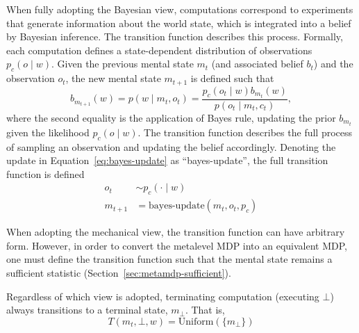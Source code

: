 When fully adopting the Bayesian view, computations correspond to experiments that generate information about the world state, which is integrated into a belief by Bayesian inference. The transition function describes this process. Formally, each computation defines a state-dependent distribution of observations $p_c(o \mid w)$. Given the previous mental state $m_t$ (and associated belief $b_t$) and the observation $o_t$, the new mental state $m_{t+1}$ is defined such that
%
\begin{equation}\label{eq:bayes-update}
  b_{m_{t+1}}(w) = p(w \mid m_t, o_t) = \frac{
    p_c(o_t \mid w) b_{m_t}(w) 
  }{
    p(o_t \mid m_t, c_t)
  },
\end{equation}
%
where the second equality is the application of Bayes rule, updating the prior $b_{m_t}$ given the likelihood $p_c(o \mid w)$. The transition function describes the full process of sampling an observation and updating the belief accordingly. Denoting the update in Equation~\ref{eq:bayes-update} as ``bayes-update'', the full transition function is defined
%
\begin{align}
  o_t &\sim p_c(\cdot \mid w) \\
  m_{t+1} &= \text{bayes-update}(m_t, o_t, p_c)
\end{align}

When adopting the mechanical view, the transition function can have arbitrary form. However, in order to convert the metalevel MDP into an equivalent MDP, one must define the transition function such that the mental state remains a sufficient statistic (Section~\ref{sec:metamdp-sufficient}).

Regardless of which view is adopted, terminating computation (executing $\bot$) always transitions to a terminal state, $m_\bot$. That is,
%
\begin{equation}
  T(m_t, \bot, w) = \text{Uniform}(\{m_\bot\})
\end{equation}
%





